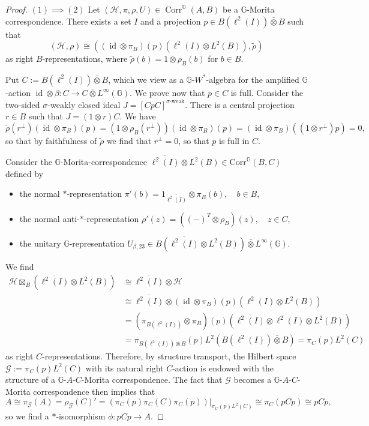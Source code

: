 \documentclass[reqno]{amsart}
\numberwithin{equation}{section}
\DeclareMathOperator{\id}{\mathrm{id}}
\newcommand{\G}{\mathbb{G}}
\newcommand{\Corr}{\mathrm{Corr}}
\newcommand{\ovot}{\bar{\otimes}}
\begin{document}
\begin{proof} $(1)\implies (2)$ Let $(\mathcal{H}, \pi, \rho, U)\in \operatorname{Corr}^\G(A,B)$ be a $\G$-Morita correspondence. There exists a set $I$ and a projection $p\in B(\ell^2(I))\ovot B$ such that 
$$(\mathcal{H}, \rho)\cong ((\id \otimes \pi_B)(p)(\ell^2(I)\otimes L^2(B)), \tilde{\rho})$$
as right $B$-representations, where $\tilde{\rho}(b) = 1\otimes \rho_B(b)$ for $b\in B$.

Put $C:= B(\ell^2(I))\ovot B$, which we view as a $\G$-$W^*$-algebra for the amplified $\G$-action $\id \otimes \beta: C \to C \ovot L^\infty(\G)$. We prove now that $p\in C$ is full. Consider the two-sided $\sigma$-weakly closed ideal
$J = [CpC]^{\sigma\text{-weak}}.$
There is a central projection $r\in B$ such that $J = (1\otimes r)C$. We have
$$\tilde{\rho}(r^\perp)(\id \otimes \pi_B)(p)= (1\otimes \rho_B(r^\perp))(\id \otimes \pi_B)(p)= (\id \otimes \pi_B)((1\otimes r^\perp)p)= 0,$$
so that by faithfulness of $\tilde{\rho}$ we find that $r^\perp= 0$, so that $p$ is full in $C$.

Consider the $\G$-Morita-correspondence $\overline{\ell^2(I)}\otimes L^2(B)\in \Corr^\G(B,C)$ defined by
    \begin{itemize}\setlength\itemsep{-0.5em}
        \item the normal $*$-representation $\pi'(b) = 1_{\overline{\ell^2(I)}}\otimes \pi_B(b), \quad b \in B,$
        \item the normal anti-$*$-representation $\rho'(z) = ({(-)}^T \otimes \rho_B)(z), \quad z \in C,$
        \item the unitary $\G$-representation $U_{\beta, 23}\in B(\overline{\ell^2(I)}\otimes L^2(B))\ovot L^\infty(\G)$.
    \end{itemize}
We find
\begin{align*}
    \mathcal{H}\boxtimes_B (\overline{\ell^2(I)}\otimes L^2(B)) &\cong \overline{\ell^2(I)}\otimes \mathcal{H}\\
    &\cong \overline{\ell^2(I)}\otimes (\id \otimes \pi_B)(p)(\ell^2(I)\otimes L^2(B))\\
    &= (\pi_{B(\ell^2(I))}\otimes \pi_B)(p)(\overline{\ell^2(I)}\otimes \ell^2(I)\otimes L^2(B))\\
    &= \pi_{B(\ell^2(I))\ovot B}(p)L^2(B(\ell^2(I))\ovot B) = \pi_C(p)L^2(C)
\end{align*}
as right $C$-representations. Therefore, by structure transport, the Hilbert space $\mathcal{G}:=\pi_C(p)L^2(C)$ with its natural right $C$-action is endowed with the structure of a $\G$-$A$-$C$-Morita correspondence. The fact that $\mathcal{G}$ becomes a $\G$-$A$-$C$-Morita correspondence then implies that 
$$A \cong \pi_\mathcal{G}(A)= \rho_\mathcal{G}(C)' = (\pi_C(p) \pi_C(C) \pi_C(p))\vert_{\pi_C(p)L^2(C)}\cong \pi_C(pCp)\cong pCp,$$
so we find a $*$-isomorphism $\phi: pCp \to A$.


\end{proof}
\end{document}
